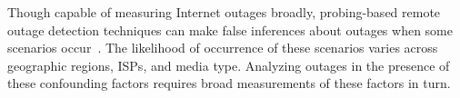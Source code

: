 

Though capable of measuring Internet outages broadly, probing-based
remote outage detection techniques can make false inferences about
outages when some scenarios occur~\cite{timeouts,
addrchange-reasons}. The likelihood of occurrence of these scenarios
varies across geographic regions, ISPs, and media type. Analyzing
outages in the presence of these confounding factors requires broad
measurements of these factors in turn.





